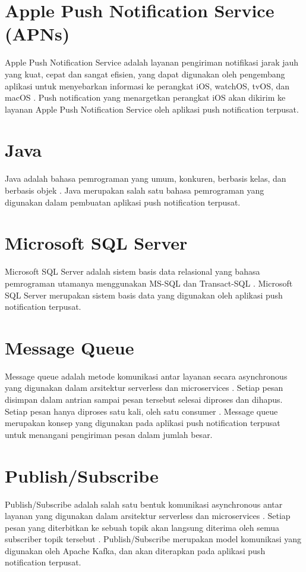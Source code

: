 \section{Apple Push Notification Service (APNs)}
\par Apple Push Notification Service adalah layanan pengiriman notifikasi jarak jauh yang kuat, cepat dan sangat efisien, yang dapat digunakan oleh pengembang aplikasi untuk menyebarkan informasi ke perangkat iOS, watchOS, tvOS, dan macOS \cite{apns-online}. Push notification yang menargetkan perangkat iOS akan dikirim ke layanan Apple Push Notification Service oleh aplikasi push notification terpusat.

\section{Java}
\par Java adalah bahasa pemrograman yang umum, konkuren, berbasis kelas, dan berbasis objek \cite{java-online}. Java merupakan salah satu bahasa pemrograman yang digunakan dalam pembuatan aplikasi push notification terpusat.

\section{Microsoft SQL Server}
\par Microsoft SQL Server adalah sistem basis data relasional yang bahasa pemrograman utamanya menggunakan MS-SQL dan Transact-SQL \cite{sqlserver-thesis}. Microsoft SQL Server merupakan sistem basis data yang digunakan oleh aplikasi push notification terpusat.

\section{Message Queue}
\par Message queue adalah metode komunikasi antar layanan secara asynchronous yang digunakan dalam arsitektur serverless dan microservices \cite{message-queue-online}. Setiap pesan disimpan dalam antrian sampai pesan tersebut selesai diproses dan dihapus. Setiap pesan hanya diproses satu kali, oleh satu consumer \cite{message-queue-online}. Message queue merupakan konsep yang digunakan pada aplikasi push notification terpusat untuk menangani pengiriman pesan dalam jumlah besar.

\section{Publish/Subscribe}
\par Publish/Subscribe adalah salah satu bentuk komunikasi asynchronous antar layanan yang digunakan dalam arsitektur serverless dan microservices \cite{publish-subscribe-online}. Setiap pesan yang diterbitkan ke sebuah topik akan langsung diterima oleh semua subscriber topik tersebut \cite{publish-subscribe-online}. Publish/Subscribe merupakan model komunikasi yang digunakan oleh Apache Kafka, dan akan diterapkan pada aplikasi push notification terpusat.

